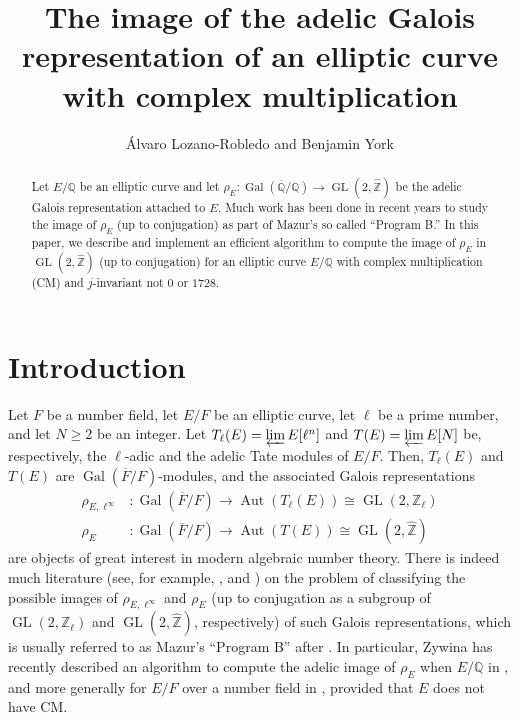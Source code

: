 \documentclass[11pt]{amsart}
\title[The adelic Galois image of an elliptic curve with complex multiplication]{The image of the adelic Galois representation of an elliptic curve with complex multiplication}
\author{\'Alvaro Lozano-Robledo and Benjamin York}
\theoremstyle{definition}
\newcommand{\Q}{\mathbb{Q}}
\newcommand{\Z}{\mathbb{Z}}
\newcommand{\Gal}{\operatorname{Gal}}
\newcommand{\Aut}{\operatorname{Aut}}
\newcommand{\GL}{\operatorname{GL}}
\begin{document}
\begin{abstract}
Let $E/\mathbb{Q}$ be an elliptic curve and let $\rho_E \colon \operatorname{Gal}(\overline{\mathbb{Q}}/\mathbb{Q}) \to \operatorname{GL}(2, \widehat{\mathbb{Z}})$ be the adelic Galois representation attached to $E$. Much work has been done in recent years to study the image of $\rho_E$ (up to conjugation) as part of Mazur's so called ``Program B.'' In this paper, we describe and implement an efficient algorithm to compute the image of $\rho_E$ in $\operatorname{GL}(2, \widehat{\mathbb{Z}})$ (up to conjugation) for an elliptic curve $E/\mathbb{Q}$ with complex multiplication (CM) and $j$-invariant not $0$ or $1728$.
\end{abstract}

\maketitle



\section{Introduction}

Let $F$ be a number field, let $E/F$ be an elliptic curve, let $\ell$ be a prime number, and let $N\geq 2$ be an integer. Let $T_\ell(E)=\varprojlim E[\ell^n]$ and $T(E)=\varprojlim E[N]$ be, respectively, the $\ell$-adic and the adelic Tate modules of $E/F$. Then, $T_\ell(E)$ and $T(E)$ are $\Gal(\overline{F}/F)$-modules, and the associated Galois representations
\begin{align*}
   \rho_{E,\ell^{\infty}} &\colon \Gal(\overline{F}/F)\to \Aut(T_\ell(E))\cong \GL(2,\Z_\ell)\\
      \rho_{E} &\colon \Gal(\overline{F}/F)\to \Aut(T(E))\cong \GL(2,\widehat{\Z})
\end{align*}
are objects of great interest in modern algebraic number theory. There is indeed much literature (see, for example, \cite{2adic}, \cite{elladic} and \cite{zywina}) on the problem of classifying the possible images of $\rho_{E,\ell^\infty}$ and $\rho_E$ (up to conjugation as a subgroup of $\GL(2,\Z_\ell)$ and $\GL(2,\widehat{\Z})$, respectively) of such Galois representations, which is usually referred to as Mazur's ``Program B'' after \cite{mazurprogramb}. In particular, Zywina has recently described an algorithm to compute the adelic image of $\rho_E$ when $E/\Q$ in \cite{zywinaadelic1}, and more generally for $E/F$ over a number field in \cite{zywinaadelic2}, provided that $E$ does not have CM. 
\end{document}
